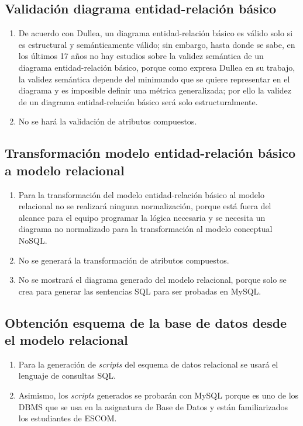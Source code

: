\subsection*{Validación diagrama entidad-relación básico}
\begin{enumerate}
    \item De acuerdo con Dullea\cite{dullea_analysis_2003}, un diagrama entidad-relación básico es válido solo si es estructural y semánticamente válido; sin embargo, hasta donde se sabe, en los últimos 17 años no hay estudios sobre la validez semántica de un diagrama entidad-relación básico, porque como expresa Dullea en su trabajo, la validez semántica depende del minimundo que se quiere representar en el diagrama y es imposible definir una métrica generalizada; por ello la validez de un diagrama entidad-relación básico será solo estructuralmente.
    \item No se hará la validación de atributos compuestos.

\end{enumerate}

\subsection*{Transformación modelo entidad-relación básico a modelo relacional}
\begin{enumerate}
    \item Para la transformación del modelo entidad-relación básico al modelo relacional no se realizará ninguna normalización, porque está fuera del alcance para el equipo programar la lógica necesaria y se necesita un diagrama no normalizado para la transformación al modelo conceptual NoSQL.
    \item No se generará la transformación de atributos compuestos.
    \item No se mostrará el diagrama generado del modelo relacional, porque solo se crea para generar las sentencias SQL para ser probadas en MySQL.
\end{enumerate}

\subsection*{Obtención esquema de la base de datos desde el modelo relacional}
\begin{enumerate}
    \item Para la generación de \textit{scripts} del esquema de datos relacional se usará el lenguaje de consultas SQL.
    \item Asimismo, los \textit{scripts} generados se probarán con MySQL porque es uno de los DBMS que se usa en la asignatura de Base de Datos y están familiarizados los estudiantes de ESCOM.
\end{enumerate}

